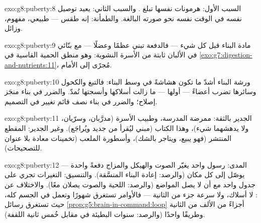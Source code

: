\begin{solution}{exo:g8:puberty:8}
السبب الأول: هرمونات  نفسها تبلغ . والسبب الثاني:
 يعيد توصيل نفسه في الوقت نفسه نحو صورته البالغة. والطمأنة:
إنه طقس --- طبيعي، مفهوم، وزائل.
\end{solution}

\begin{solution}{exo:g8:puberty:9}
مادة البناء قبل كل شيء --- فالدفعة تبني عظمًا وعضلًا --- مع بنّائي
 في الألبان  ثابتة من الأسرة النشوية: وهو منطق الحمية
القاسية في \cref{exo:g7:digestion-and-nutrients:11}، مُجرًى إلى
الأمام.
\end{solution}

\begin{solution}{exo:g8:puberty:10}
ورشة البناء أشدّ ما تكون هشاشةً في وسط البناء: فالتبغ والكحول
وسائرها تضرب أعضاءً ---  أولها --- ما زالت أسلاكها وأنسجتها
تُمدّ. والضرر في بناء منجَز إصلاح؛ والضرر في بناء نصف قائم تغيير
في التصميم.
\end{solution}

\begin{solution}{exo:g8:puberty:11}
الجدير بالثقة: ممرضة المدرسة، وطبيب الأسرة (مدرَّبان، وسرّيان، ولا
يدهشهما شيء)، وهذا الكتاب (مبني ليُقرأ من جديد ويُراجَع). وغير
الجدير: المقطع المنتشر (فهو يبيع، ويتاجر بالشك)، وأسطورة الملعب
(تخمينات معادة بلا عنوان للتصحيحات).
\end{solution}

\begin{solution}{exo:g8:puberty:12}
المدى: رسول واحد يغيّر الصوت  والهيكل والمزاج دفعةً واحدة ---
 يوصّل إلى كل مكان (والرصد: إعادة البناء المنسَّقة). والتنسيق:
التغيرات تجري على جدول واحد مع أن لا  يصل المواضع (والرصد:
اللحية والصوت يصلان معًا). والاختلاف عن : لا أسلاك، ولا
سرعة جزء من الثانية --- فالأوامر تستغرق شهورًا وتعمل في الجسم كله،
حيث تستغرق رسائل \cref{prop:g5:brain-in-command:loop} أجزاءً من
الألف من الثانية وطريقًا واحدًا (والرصد: سنوات  البطيئة في
مقابل خُمس ثانية اللقفة).
\end{solution}

